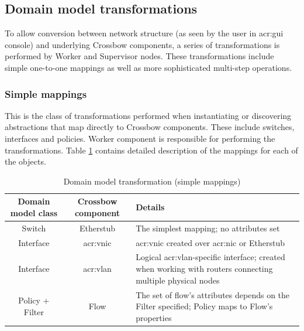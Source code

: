 \documentclass[11pt,openany]{book}
\begin{document}
      \subsection{Domain model transformations}
      \label{sec:impl:model}

        To allow conversion between network structure (as seen by the user in \gls{acr:gui} console) and underlying
        Crossbow components, a series of transformations is performed by Worker and Supervisor nodes. These
        transformations include simple one-to-one mappings as well as more sophisticated multi-step operations.


        \subsubsection{Simple mappings}

          This is the class of transformations performed when instantiating or discovering abstractions that map
          directly to Crossbow components. These include switches, interfaces and policies. Worker component is
          responsible for performing the transformations. Table \ref{tab:impl:simple-mapping} contains detailed
          description of the mappings for each of the objects.

          \begin{table}[H]
            \centering

            \begin{tabularx}{\textwidth}{|c|c|X|}
              \hline
              Domain model class & Crossbow component & \centering Details                                              \tabularnewline
              \hline \hline
              Switch             & Etherstub          & The simplest mapping; no attributes set                         \\
              \hline
              Interface          & \gls{acr:vnic}     & \gls{acr:vnic} created over \gls{acr:nic} or Etherstub          \\
              \hline
              Interface          & \gls{acr:vlan}     & Logical \gls{acr:vlan}-specific interface; created when working
                                                        with routers connecting multiple physical nodes                 \\
              \hline
              Policy + Filter    & Flow               & The set of flow's attributes depends on the Filter specified;
                                                        Policy maps to Flow's properties                                \\
              \hline
            \end{tabularx}

            \caption{Domain model transformation (simple mappings)}
            \label{tab:impl:simple-mapping}
          \end{table}
\end{document}

